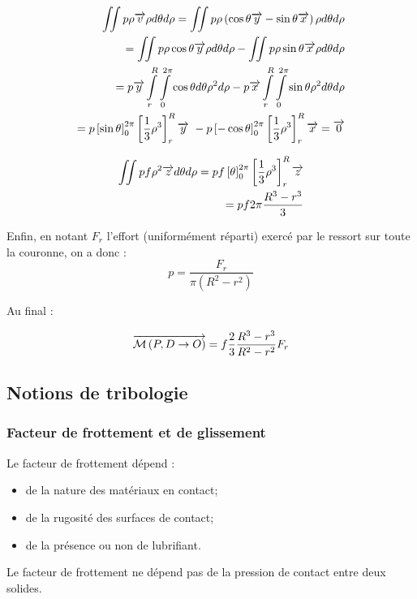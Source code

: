 \documentclass[10pt]{article}
\begin{document}
\begin{exemple}
\begin{eqnarray*}
\iint p\rho\overrightarrow{v} \rho d\theta d\rho = \iint p\rho\left(\cos\theta\overrightarrow{y}-\sin\theta\overrightarrow{x} \right) \rho d\theta d\rho \\
=\iint p\rho\cos\theta\overrightarrow{y}  \rho d\theta d\rho-\iint p\rho \sin\theta\overrightarrow{x}  \rho d\theta d\rho \\
=p \overrightarrow{y}  \int\limits_{r}^{R} \int\limits_{0}^{2\pi}\cos\theta d\theta \rho^2 d\rho- p\overrightarrow{x}\int\limits_{r}^{R} \int\limits_{0}^{2\pi} \sin\theta  \rho^2 d\theta d\rho \\
=p \left[ \sin\theta\right]_{0}^{2\pi}\left[ \dfrac{1}{3}\rho^3\right]_{r}^{R}\overrightarrow{y}\
 -
p \left[ -\cos\theta\right]_{0}^{2\pi}\left[ \dfrac{1}{3}\rho^3\right]_{r}^{R}\overrightarrow{x} = \overrightarrow{0}
\end{eqnarray*}

\begin{eqnarray*}
\iint pf\rho^2 \overrightarrow{z} d\theta d\rho =
pf \left[ \theta\right]_{0}^{2\pi}\left[ \dfrac{1}{3}\rho^3\right]_{r}^{R} \overrightarrow{z}\\
= pf2\pi \dfrac{R^3-r^3}{3} 
\end{eqnarray*} 

Enfin, en notant $F_r$ l'effort (uniformément réparti) exercé par le ressort sur toute la couronne, on a donc :
$$
p=\dfrac{F_r}{\pi \left(R^2-r^2 \right)}
$$

Au final : 

$$ \overrightarrow{\mathcal{M}\left( {P}, {D} \rightarrow {O}\right)}  
= f\dfrac{2}{3} \dfrac{R^3-r^3}{R^2-r^2} F_r
$$
\end{exemple}
\subsection{Notions de tribologie}

\subsubsection{Facteur de frottement et de glissement}
Le facteur de frottement dépend : 
\begin{itemize}
\item de la nature des matériaux en contact; 
\item de la rugosité des surfaces de contact; 
\item de la présence ou non de lubrifiant.
\end{itemize}

Le facteur de frottement ne dépend pas de la pression de contact entre deux solides.
\end{document}
